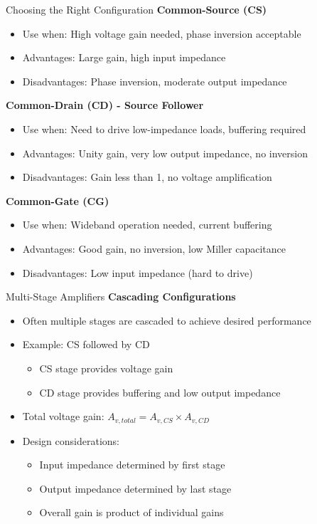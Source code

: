 \documentclass[10pt, aspectratio=169]{beamer}
\begin{document}
\begin{frame}{Choosing the Right Configuration}
\textbf{Common-Source (CS)}
\begin{itemize}
\item Use when: High voltage gain needed, phase inversion acceptable
\item Advantages: Large gain, high input impedance
\item Disadvantages: Phase inversion, moderate output impedance
\end{itemize}

\vspace{0.3cm}
\textbf{Common-Drain (CD) - Source Follower}
\begin{itemize}
\item Use when: Need to drive low-impedance loads, buffering required
\item Advantages: Unity gain, very low output impedance, no inversion
\item Disadvantages: Gain less than 1, no voltage amplification
\end{itemize}

\vspace{0.3cm}
\textbf{Common-Gate (CG)}
\begin{itemize}
\item Use when: Wideband operation needed, current buffering
\item Advantages: Good gain, no inversion, low Miller capacitance
\item Disadvantages: Low input impedance (hard to drive)
\end{itemize}
\end{frame}

\begin{frame}{Multi-Stage Amplifiers}
\textbf{Cascading Configurations}
\begin{itemize}
\item Often multiple stages are cascaded to achieve desired performance
\item Example: CS followed by CD
  \begin{itemize}
  \item CS stage provides voltage gain
  \item CD stage provides buffering and low output impedance
  \end{itemize}
\item Total voltage gain: $A_{v,total} = A_{v,CS} \times A_{v,CD}$
\item Design considerations:
  \begin{itemize}
  \item Input impedance determined by first stage
  \item Output impedance determined by last stage
  \item Overall gain is product of individual gains
  \end{itemize}
\end{itemize}
\end{frame}
\end{document}
